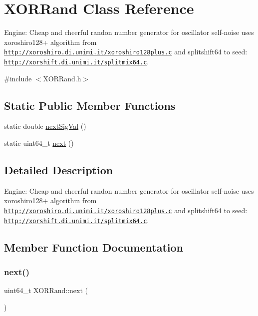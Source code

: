 \hypertarget{classXORRand}{}\section{X\+O\+R\+Rand Class Reference}
\label{classXORRand}


Engine\+: Cheap and cheerful randon number generator for oscillator self-\/noise uses xoroshiro128+ algorithm from \href{http://xoroshiro.di.unimi.it/xoroshiro128plus.c}{\tt http\+://xoroshiro.\+di.\+unimi.\+it/xoroshiro128plus.\+c} and splitshift64 to seed\+: \href{http://xorshift.di.unimi.it/splitmix64.c}{\tt http\+://xorshift.\+di.\+unimi.\+it/splitmix64.\+c}.  




{\ttfamily \#include $<$X\+O\+R\+Rand.\+h$>$}

\subsection*{Static Public Member Functions}
\begin{DoxyCompactItemize}
\item 
static double \mbox{\hyperlink{classXORRand_a18ba05ab627075c54de5779e43fb599c}{next\+Sig\+Val}} ()
\item 
static uint64\+\_\+t \mbox{\hyperlink{classXORRand_ac625eb230653c32a862c34eacaf8061a}{next}} ()
\end{DoxyCompactItemize}


\subsection{Detailed Description}
Engine\+: Cheap and cheerful randon number generator for oscillator self-\/noise uses xoroshiro128+ algorithm from \href{http://xoroshiro.di.unimi.it/xoroshiro128plus.c}{\tt http\+://xoroshiro.\+di.\+unimi.\+it/xoroshiro128plus.\+c} and splitshift64 to seed\+: \href{http://xorshift.di.unimi.it/splitmix64.c}{\tt http\+://xorshift.\+di.\+unimi.\+it/splitmix64.\+c}. 

\subsection{Member Function Documentation}
\mbox{\label{classXORRand_ac625eb230653c32a862c34eacaf8061a}} 
\subsubsection{\texorpdfstring{next()}{next()}}
{\footnotesize\ttfamily uint64\+\_\+t X\+O\+R\+Rand\+::next (\begin{DoxyParamCaption}{ }\end{DoxyParamCaption})\hspace{0.3cm}{\ttfamily [static]}}

